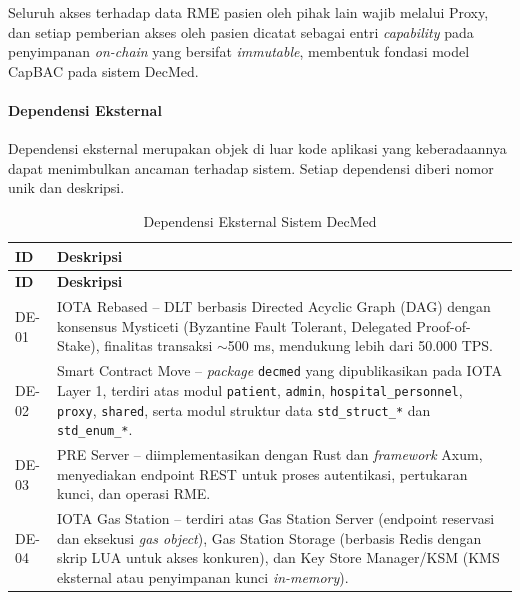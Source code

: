 Seluruh akses terhadap data RME pasien oleh pihak lain wajib melalui Proxy, dan setiap pemberian akses oleh pasien dicatat sebagai entri \textit{capability} pada penyimpanan \textit{on-chain} yang bersifat \textit{immutable}, membentuk fondasi model CapBAC pada sistem DecMed.

\paragraph{Dependensi Eksternal}

Dependensi eksternal merupakan objek di luar kode aplikasi yang keberadaannya dapat menimbulkan ancaman terhadap sistem. Setiap dependensi diberi nomor unik dan deskripsi.

\begin{xltabular}{\textwidth}{|>{\centering\arraybackslash}p{1.2cm}|X|}
    \caption{Dependensi Eksternal Sistem DecMed}
    \label{tab:dependensi-eksternal} \\
    \hline
    \textbf{ID} & \textbf{Deskripsi} \\
    \hline
    \endfirsthead
    \hline
    \textbf{ID} & \textbf{Deskripsi} \\
    \hline
    \endhead
    \hline
    \endfoot
    \hline
    \endlastfoot

    DE-01 & IOTA Rebased -- DLT berbasis Directed Acyclic Graph (DAG) dengan konsensus Mysticeti (Byzantine Fault Tolerant, Delegated Proof-of-Stake), finalitas transaksi $\sim$500 ms, mendukung lebih dari 50.000 TPS. \\
    \hline

    DE-02 & Smart Contract Move -- \textit{package} \texttt{decmed} yang dipublikasikan pada IOTA Layer 1, terdiri atas modul \texttt{patient}, \texttt{admin}, \texttt{hospital\_personnel}, \texttt{proxy}, \texttt{shared}, serta modul struktur data \texttt{std\_struct\_*} dan \texttt{std\_enum\_*}. \\
    \hline

    DE-03 & PRE Server -- diimplementasikan dengan Rust dan \textit{framework} Axum, menyediakan endpoint REST untuk proses autentikasi, pertukaran kunci, dan operasi RME. \\
    \hline

    DE-04 & IOTA Gas Station -- terdiri atas Gas Station Server (endpoint reservasi dan eksekusi \textit{gas object}), Gas Station Storage (berbasis Redis dengan skrip LUA untuk akses konkuren), dan Key Store Manager/KSM (KMS eksternal atau penyimpanan kunci \textit{in-memory}). \\
    \hline


\end{xltabular}
